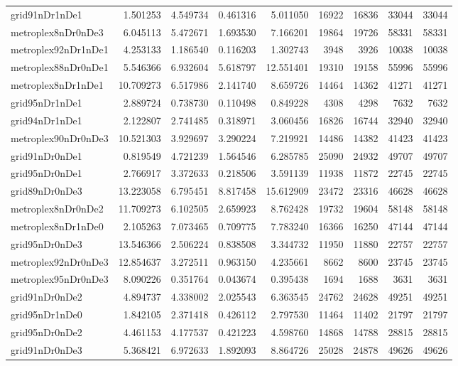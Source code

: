 \begin{longtable}{|l|r|r|r|r|r|r|r|r|}
grid91nDr1nDe1 & 1.501253 & 4.549734 & 0.461316 & 5.011050 & 16922 & 16836 & 33044 & 33044 \\
metroplex8nDr0nDe3 & 6.045113 & 5.472671 & 1.693530 & 7.166201 & 19864 & 19726 & 58331 & 58331 \\
metroplex92nDr1nDe1 & 4.253133 & 1.186540 & 0.116203 & 1.302743 & 3948 & 3926 & 10038 & 10038 \\
metroplex88nDr0nDe1 & 5.546366 & 6.932604 & 5.618797 & 12.551401 & 19310 & 19158 & 55996 & 55996 \\
metroplex8nDr1nDe1 & 10.709273 & 6.517986 & 2.141740 & 8.659726 & 14464 & 14362 & 41271 & 41271 \\
grid95nDr1nDe1 & 2.889724 & 0.738730 & 0.110498 & 0.849228 & 4308 & 4298 & 7632 & 7632 \\
grid94nDr1nDe1 & 2.122807 & 2.741485 & 0.318971 & 3.060456 & 16826 & 16744 & 32940 & 32940 \\
metroplex90nDr0nDe3 & 10.521303 & 3.929697 & 3.290224 & 7.219921 & 14486 & 14382 & 41423 & 41423 \\
grid91nDr0nDe1 & 0.819549 & 4.721239 & 1.564546 & 6.285785 & 25090 & 24932 & 49707 & 49707 \\
grid95nDr0nDe1 & 2.766917 & 3.372633 & 0.218506 & 3.591139 & 11938 & 11872 & 22745 & 22745 \\
grid89nDr0nDe3 & 13.223058 & 6.795451 & 8.817458 & 15.612909 & 23472 & 23316 & 46628 & 46628 \\
metroplex8nDr0nDe2 & 11.709273 & 6.102505 & 2.659923 & 8.762428 & 19732 & 19604 & 58148 & 58148 \\
metroplex8nDr1nDe0 & 2.105263 & 7.073465 & 0.709775 & 7.783240 & 16366 & 16250 & 47144 & 47144 \\
grid95nDr0nDe3 & 13.546366 & 2.506224 & 0.838508 & 3.344732 & 11950 & 11880 & 22757 & 22757 \\
metroplex92nDr0nDe3 & 12.854637 & 3.272511 & 0.963150 & 4.235661 & 8662 & 8600 & 23745 & 23745 \\
metroplex95nDr0nDe3 & 8.090226 & 0.351764 & 0.043674 & 0.395438 & 1694 & 1688 & 3631 & 3631 \\
grid91nDr0nDe2 & 4.894737 & 4.338002 & 2.025543 & 6.363545 & 24762 & 24628 & 49251 & 49251 \\
grid95nDr1nDe0 & 1.842105 & 2.371418 & 0.426112 & 2.797530 & 11464 & 11402 & 21797 & 21797 \\
grid95nDr0nDe2 & 4.461153 & 4.177537 & 0.421223 & 4.598760 & 14868 & 14788 & 28815 & 28815 \\
grid91nDr0nDe3 & 5.368421 & 6.972633 & 1.892093 & 8.864726 & 25028 & 24878 & 49626 & 49626 \\

\end{longtable}
